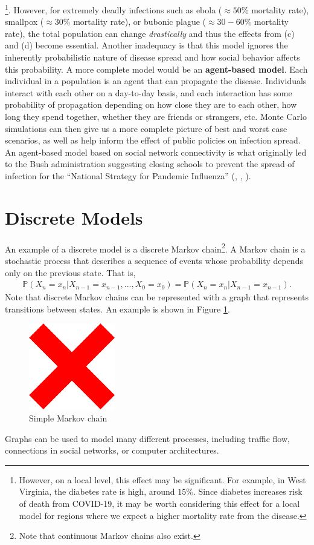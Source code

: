 \footnote{However, on a local level, this effect may be significant. For example, in West Virginia, the diabetes rate is high, around $15\%$. Since diabetes increases risk of death from COVID-19, it may be worth considering this effect for a local model for regions where we expect a higher mortality rate from the disease.}. 
However, for extremely deadly infections such as ebola ($\approx50\%$ mortality rate), smallpox ($\approx 30\%$ mortality rate), or bubonic plague ($\approx 30-60\%$ mortality rate), the total population can change \textit{drastically} and thus the effects from (c) and (d) become essential. 
Another inadequacy is that this model ignores the inherently probabilistic nature of disease spread and how social behavior affects this probability. 
A more complete model would be an \textbf{agent-based model}. Each individual in a population is an agent that can propagate the disease. Individuals interact with each other on a day-to-day basis, and each interaction has some probability of propagation depending on how close they are to each other, how long they spend together, whether they are friends or strangers, etc. 
Monte Carlo simulations can then give us a more complete picture of best and worst case scenarios, as well as help inform the effect of public policies on infection spread. 
An agent-based model based on social network connectivity is what originally led to the Bush administration suggesting closing schools to prevent the spread of infection for the ``National Strategy for Pandemic Influenza'' (\cite{glass2006targeted}, \cite{lewis2021premonition}, \cite{homeland2005national}). 

\section{Discrete Models}
An example of a discrete model is a discrete Markov chain\footnote{Note that continuous Markov chains also exist.}. A Markov chain is a stochastic process that describes a sequence of events whose probability depends only on the previous state. That is,
\begin{align}
    \mathbb{P}(X_n=x_n | X_{n-1}=x_{n-1},...,X_0=x_0) = \mathbb{P}(X_n=x_n | X_{n-1}=x_{n-1}).
\end{align}
Note that discrete Markov chains can be represented with a graph that represents transitions between states. An example is shown in Figure \ref{fig:markov}.
\begin{figure}
    \centering
    \includegraphics{images/x.pdf}
    \caption{Simple Markov chain}
    \label{fig:markov}
\end{figure}
Graphs can be used to model many different processes, including traffic flow, connections in social networks, or computer architectures. 

